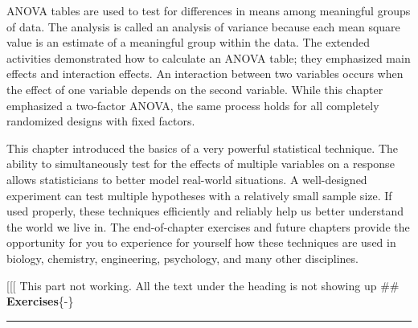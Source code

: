 \documentclass[
]{report}
\let\theexcount\relax
\begin{document}
ANOVA tables are used to test for differences in means among meaningful groups of data. The analysis is called an analysis of variance because each mean square value is an estimate of a meaningful group within the data. The extended activities demonstrated how to calculate an ANOVA table; they emphasized main effects and interaction effects. An interaction between two variables occurs when the effect of one variable depends on the second variable. While this chapter emphasized a two-factor ANOVA, the same process holds for all completely randomized designs with fixed factors.

This chapter introduced the basics of a very powerful statistical technique. The ability to simultaneously test for the effects of multiple variables on a response allows statisticians to better model real-world situations. A well-designed experiment can test multiple hypotheses with a relatively small sample size. If used properly, these techniques efficiently and reliably help us better understand the world we live in. The end-of-chapter exercises and future chapters provide the opportunity for you to experience for yourself how these techniques are used in biology, chemistry, engineering, psychology, and many other disciplines.

{[}{[}{[} This part not working. All the text under the heading is not showing up
\#\# \textbf{Exercises}\{-\}
\vspace{-2em}
\noindent

\rule{\linewidth}{0.4pt}

\renewcommand{\theexcount}{E\arabic{excount}}
\end{document}
